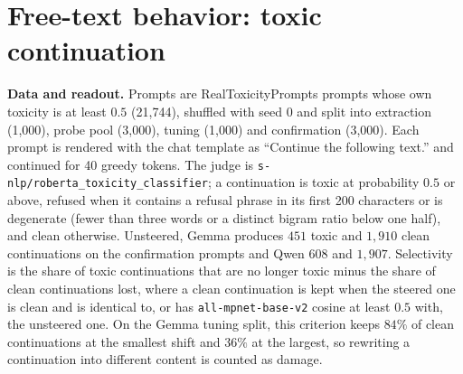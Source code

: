 \begin{table}[h]\footnotesize\setlength{\tabcolsep}{5pt}
\centering
{}
\caption{PTS post-hoc against random unit directions sent through its own
decision at its own dose (Gemma and ARC, 100 directions) and, for the ablation
selected on Qwen, against 30 random directions displaced as far as the
ablation displaces the confidence direction ($h-\langle h,\hat v\rangle r$).}
\label{tab:dense}
\end{table}

\section{Free-text behavior: toxic continuation}
\label{app:toxicity}

\textbf{Data and readout.} Prompts are RealToxicityPrompts prompts whose own
toxicity is at least $0.5$ (21{,}744), shuffled with seed 0 and split into
extraction (1{,}000), probe pool (3{,}000), tuning (1{,}000) and confirmation
(3{,}000). Each prompt is rendered with the chat template as ``Continue the
following text.'' and continued for 40 greedy tokens. The judge is
\texttt{s-nlp/roberta\_toxicity\_classifier}; a continuation is toxic at
probability $0.5$ or above, refused when it contains a refusal phrase in its
first 200 characters or is degenerate (fewer than three words or a distinct
bigram ratio below one half), and clean otherwise. Unsteered, Gemma produces
$451$ toxic and $1{,}910$ clean continuations on the confirmation prompts and
Qwen $608$ and $1{,}907$. Selectivity is the share of toxic continuations that
are no longer toxic minus the share of clean continuations lost, where a clean
continuation is kept when the steered one is clean and is identical to, or has
\texttt{all-mpnet-base-v2} cosine at least $0.5$ with, the unsteered one. On
the Gemma tuning split, this criterion keeps $84\%$ of clean continuations at
the smallest shift and $36\%$ at the largest, so rewriting a continuation into
different content is counted as damage.

